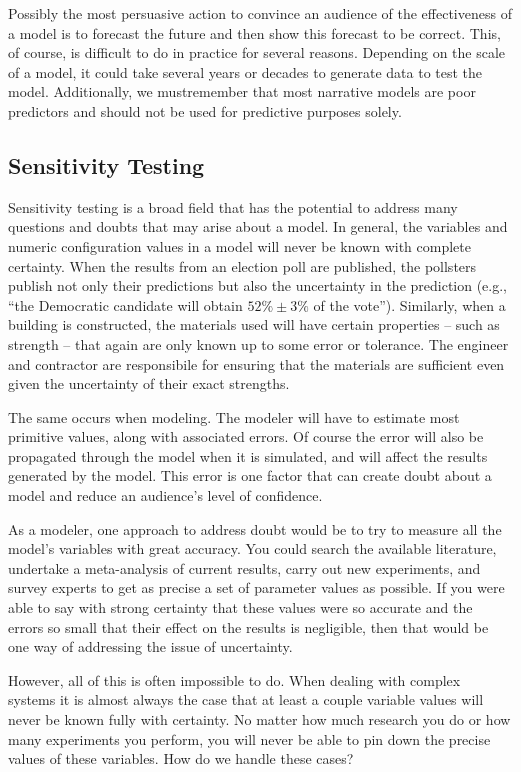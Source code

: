 \documentclass[]{memoir}
\begin{document}
Possibly the most persuasive action to convince an audience of the
effectiveness of a model is to forecast the future and then show this
forecast to be correct. This, of course, is difficult to do in practice
for several reasons. Depending on the scale of a model, it could take
several years or decades to generate data to test the model.
Additionally, we mustremember that most narrative models are poor
predictors and should not be used for predictive purposes solely.

\subsection{Sensitivity Testing}

Sensitivity testing is a broad field that has the potential to address
many questions and doubts that may arise about a model. In general, the
variables and numeric configuration values in a model will never be
known with complete certainty. When the results from an election poll
are published, the pollsters publish not only their predictions but also
the uncertainty in the prediction (e.g., ``the Democratic candidate will
obtain $52\% \pm 3\%$ of the vote''). Similarly, when a building is
constructed, the materials used will have certain properties -- such as
strength -- that again are only known up to some error or tolerance. The
engineer and contractor are responsibile for ensuring that the materials
are sufficient even given the uncertainty of their exact strengths.

The same occurs when modeling. The modeler will have to estimate most
primitive values, along with associated errors. Of course the error will
also be propagated through the model when it is simulated, and will
affect the results generated by the model. This error is one factor that
can create doubt about a model and reduce an audience's level of
confidence.

As a modeler, one approach to address doubt would be to try to measure
all the model's variables with great accuracy. You could search the
available literature, undertake a meta-analysis of current results,
carry out new experiments, and survey experts to get as precise a set of
parameter values as possible. If you were able to say with strong
certainty that these values were so accurate and the errors so small
that their effect on the results is negligible, then that would be one
way of addressing the issue of uncertainty.

However, all of this is often impossible to do. When dealing with
complex systems it is almost always the case that at least a couple
variable values will never be known fully with certainty. No matter how
much research you do or how many experiments you perform, you will never
be able to pin down the precise values of these variables. How do we
handle these cases?
\end{document}
